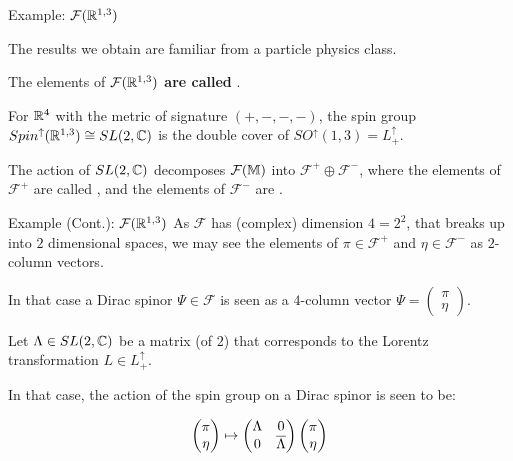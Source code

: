 \begin{frame}{Example: $\mathcal F(\mathbb R^{1, 3})$} %
    
    The results we obtain are familiar from a particle physics class. 
    
    The elements of \textbf{$\mathcal F(\mathbb R^{1, 3})$ are called }.
    
    For $\mathbb R^4$ with the metric of signature $(+, -, -, -)$, the spin group $Spin^\uparrow(\mathbb R^{1, 3}) \cong SL(2, \mathbb C)$ is the double cover of $SO^\uparrow(1, 3) = L^\uparrow_+$.
    
    The action of $SL(2, \mathbb C)$ decomposes $\mathcal F(\mathbb M)$ into $\mathcal F^+ \oplus \mathcal F^-$, where the elements of $\mathcal F^+$ are called , and the elements of $\mathcal F^-$ are .
    
\end{frame}


\begin{frame}{Example (Cont.): $\mathcal F(\mathbb R^{1, 3})$} %
    As $\mathcal F$ has (complex) dimension $4 = 2^2$, that breaks up into $2$ dimensional spaces, we may see the elements of $\pi \in \mathcal F^+$ and $\eta \in \mathcal F^-$ as $2$-column vectors. 
    
    In that case a Dirac spinor $\Psi \in \mathcal F$ is seen as a $4$-column vector $\Psi = \begin{pmatrix}\pi \\ \eta\end{pmatrix}$.
    
    Let $\Lambda \in SL(2, \mathbb C)$ be a matrix (of $2$) that corresponds to the Lorentz transformation $L \in L^\uparrow_+$.
    
    In that case, the action of the spin group on a Dirac spinor is seen to be:
    
    \[ \begin{pmatrix}\pi \\ \eta\end{pmatrix} \mapsto \begin{pmatrix} \Lambda & 0 \\ 0 & \overline{\Lambda} \end{pmatrix} \begin{pmatrix}\pi \\ \eta\end{pmatrix}\]
\end{frame}
